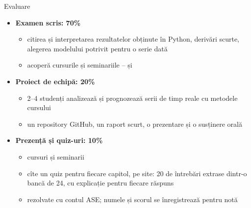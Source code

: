 \begin{frame}{Evaluare}
\itemsize{\small}
\begin{itemize}
    \item \textbf{Examen scris: 70\%}
    \begin{itemize}
        \item citirea și interpretarea rezultatelor obținute în Python, derivări scurte, alegerea modelului potrivit pentru o serie dată
        \item acoperă cursurile și seminariile -- și 
    \end{itemize}
    \item \textbf{Proiect de echipă: 20\%}
    \begin{itemize}
        \item 2--4 studenți analizează și prognozează serii de timp reale cu metodele cursului
        \item un repository GitHub, un raport scurt, o prezentare și o susținere orală
    \end{itemize}
    \item \textbf{Prezență și quiz-uri: 10\%}
    \begin{itemize}
        \item cursuri și seminarii
        \item cîte un quiz pentru fiecare capitol, pe site: 20 de întrebări extrase dintr-o bancă de 24, cu explicație pentru fiecare răspuns
        \item rezolvate cu contul ASE; numele și scorul se înregistrează pentru notă
    \end{itemize}
\end{itemize}
\end{frame}


